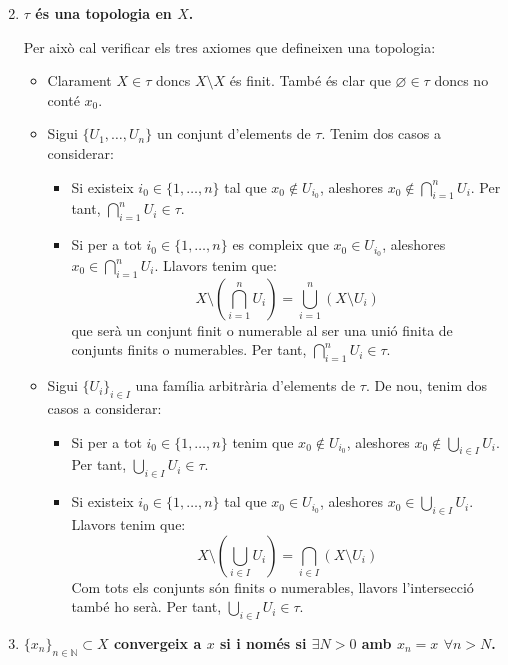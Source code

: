 \documentclass[10pt,a4paper]{article}
\newcommand{\NN}{\ensuremath{\mathbb{N}}}
\begin{document}
\begin{enumerate}\setcounter{enumi}{1}
      \item \textbf{$\tau$ és una topologia en $X$.}

            Per això cal verificar els tres axiomes que defineixen una topologia:
            \begin{itemize}
                  \item Clarament $X \in \tau$ doncs $X \setminus X$ és finit. També és clar que $\varnothing \in \tau$ doncs no conté $x_0$.
                  \item Sigui $\{U_1,\ldots, U_n\}$ un conjunt d'elements de $\tau$. Tenim dos casos a considerar:
                        \begin{itemize}
                              \item Si existeix $i_0\in\{1,\ldots,n\}$ tal que $x_0\notin U_{i_0}$, aleshores $x_0 \notin \bigcap_{i=1}^n U_i$. Per tant, $\bigcap_{i=1}^n U_i\in\tau$.
                              \item Si per a tot $i_0\in\{1,\ldots,n\}$ es compleix que $x_0\in U_{i_0}$, aleshores $x_0 \in \bigcap_{i=1}^n U_i$. Llavors tenim que: $$X \setminus \left(\bigcap_{i=1}^n U_i\right)=\bigcup_{i=1}^n (X\setminus U_i)$$ que serà un conjunt finit o numerable al ser una unió finita de conjunts finits o numerables. Per tant, $\bigcap_{i=1}^n U_i\in\tau$.
                        \end{itemize}
                  \item Sigui $\{U_i\}_{i\in I}$ una família arbitrària d'elements de $\tau$. De nou, tenim dos casos a considerar:
                        \begin{itemize}
                              \item Si per a tot $i_0\in\{1,\ldots,n\}$ tenim que $x_0\notin U_{i_0}$, aleshores $x_0 \notin \bigcup_{i\in I} U_i$. Per tant, $\bigcup_{i\in I} U_i\in\tau$.
                              \item Si existeix $i_0\in\{1,\ldots,n\}$ tal que $x_0\in U_{i_0}$, aleshores $x_0 \in \bigcup_{i\in I} U_i$. Llavors tenim que: $$X \setminus \left(\bigcup_{i\in I} U_i\right)=\bigcap_{i\in I}(X\setminus U_i)$$ Com tots els conjunts són finits o numerables, llavors l'intersecció també ho serà. Per tant, $\bigcup_{i\in I} U_i\in\tau$.
                        \end{itemize}
            \end{itemize}
      \item\label{1.3} \textbf{$\{x_n\}_{n\in\NN}\subset X$ convergeix a $x$ si i només si $\exists N>0$ amb $x_n=x$ $\forall n>N$.}


\end{enumerate}
\end{document}

